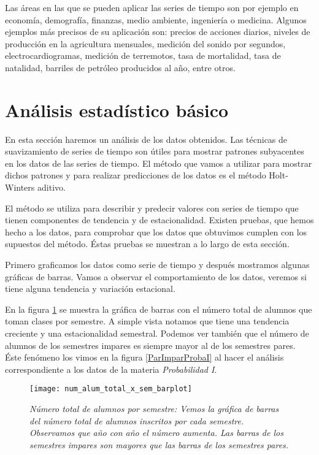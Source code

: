 Las áreas en las que se pueden aplicar las series de tiempo son por ejemplo en economía, demografía, finanzas, medio ambiente, ingeniería o medicina. Algunos ejemplos más precisos de su aplicación son: precios de acciones diarios, niveles de producción en la agricultura mensuales, medición del sonido por segundos, electrocardiogramas, medición de terremotos, tasa de mortalidad, tasa de natalidad, barriles de petróleo producidos al año, entre otros.


\section{Análisis estadístico básico}

En esta sección haremos un análisis de los datos obtenidos. Las técnicas de suavizamiento de series de tiempo son útiles para mostrar patrones subyacentes en los datos de las series de tiempo. El método que vamos a utilizar para mostrar dichos patrones y para realizar predicciones de los datos es el método Holt-Winters aditivo.


El método se utiliza para describir y predecir valores con series de tiempo que tienen componentes de tendencia y de estacionalidad. Existen pruebas, que hemos hecho a los datos, para comprobar que los datos que obtuvimos cumplen con los supuestos del método. Éstas pruebas se muestran a lo largo de esta sección.

Primero graficamos los datos como serie de tiempo y después mostramos algunas gráficas de barras. Vamos a observar el comportamiento de los datos, veremos si tiene alguna tendencia y variación estacional.

En la figura \ref{TotalAlumBarras} se muestra la gráfica de barras con el número total de alumnos que toman clases por semestre. A simple vista notamos que tiene una tendencia creciente y una estacionalidad semestral. Podemos ver también que el número de alumnos de los semestres impares es siempre mayor al de los semestres pares. Éste fenómeno los vimos en la figura \ref{ParImparProbaI} al hacer el análisis correspondiente a los datos de la materia \textit{Probabilidad I}.

\begin{figure}[H]
\centering
\texttt{[image: num\_alum\_total\_x\_sem\_barplot]} %
\caption[\textit{Número total de alumnos por semestre}]{\textit{Número total de alumnos por semestre: Vemos la gráfica de barras del número total de alumnos inscritos por cada semestre. Observamos que año con año el número aumenta. Las barras de los semestres impares son mayores que las barras de los semestres pares.}}\label{TotalAlumBarras}
\end{figure}

